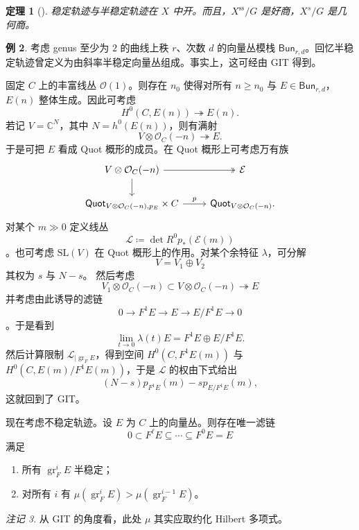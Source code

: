 \documentclass{amsart}
\newtheorem{thm}{定理}[section]
\theoremstyle{definition}
\newtheorem{exm}[thm]{例}
\theoremstyle{remark}
\newtheorem{rmk}[thm]{注记}
\theoremstyle{plain}
\theoremstyle{definition}
\theoremstyle{remark}
\newcommand{\C}{\mathbb{C}}
\newcommand{\mc}[1]{\mathcal{#1}}
\newcommand{\mr}[1]{\mathrm{#1}}
\newcommand{\on}[1]{\operatorname{#1}}
\newcommand{\ms}[1]{\mathsf{#1}}
\newcommand{\1}{\mathbf{1}}
\newcommand{\2}{\mathbf{2}}
\newcommand{\3}{\mathbf{3}}
\begin{document}
\begin{thm}[{\cite{MFK1994}}]
    稳定轨迹与半稳定轨迹在 \(X\) 中开。而且，\(X^{\on{ss}}/G\) 是好商，\(X^s/G\) 是几何商。
\end{thm}

\begin{exm}
    考虑 genus 至少为 \(2\) 的曲线上秩 \(r\)、次数 \(d\) 的向量丛模栈 \(\ms{Bun}_{r,d}\)。回忆半稳定轨迹曾定义为由斜率半稳定向量丛组成。事实上，这可经由 GIT 得到。

    固定 \(C\) 上的丰富线丛 \(\mc{O}(1)\)。则存在 \(n_0\) 使得对所有 \(n \geq n_0\) 与 \(E \in \ms{Bun}_{r,d}\)，\(E(n)\) 整体生成。因此可考虑
    \[ H^0(C, E(n)) \twoheadrightarrow E(n). \]
    若记 \(V = \C^N\)，其中 \(N = h^0(E(n))\)，则有满射
    \[ V \otimes \mc{O}_C(-n) \twoheadrightarrow E. \]
    于是可把 \(E\) 看成 Quot 概形的成员。在 Quot 概形上可考虑万有族
    \begin{equation*}
    \begin{tikzcd}
        V \otimes \mc{O}_C(-n) \ar[twoheadrightarrow]{r} \ar{d} & \mc{E} \\
        \ms{Quot}_{V \otimes \mc{O}_C(-n), p_E} \times C \ar{r}{p} & \ms{Quot}_{V \otimes \mc{O}_C(-n)}.
    \end{tikzcd}
    \end{equation*}
    对某个 \(m \gg 0\) 定义线丛
    \[ \mc{L} \coloneqq \det R^0 p_* (\mc{E}(m)) \]
    。也可考虑 \(\mr{SL}(V)\) 在 Quot 概形上的作用。对某个余特征 \(\lambda\)，可分解
    \[ V = V_1 \oplus V_2 \]
    其权为 \(s\) 与 \(N-s\)。
    然后考虑
    \[ V_1 \otimes \mc{O}_C(-n) \subset V \otimes \mc{O}_C(-n) \twoheadrightarrow E \]
    并考虑由此诱导的滤链
    \[ 0 \to F^1 E \to E \to E / F^1 E \to 0 \]
    。于是看到
    \[ \lim_{t \to 0} \lambda(t) E = F^1 E \oplus E/F^1 E. \]
    然后计算限制 \(\mc{L}_{|\on{gr}_F E}\)，得到空间 \(H^0(C, F^1 E(m))\) 与 \(H^0(C, E(m)/F^1 E(m))\)，于是 \(\mc{L}\) 的权由下式给出
    \[ (N-s) p_{F^1 E}(m) - s p_{E/F^1 E}(m), \]
    这就回到了 GIT。
\end{exm}

现在考虑不稳定轨迹。设 \(E\) 为 \(C\) 上的向量丛。则存在唯一滤链
\[ 0 \subset F^{\ell} E \subseteq \cdots \subseteq F^0 E = E \]
满足
\begin{enumerate}
    \item 所有 \(\on{gr}_F^i E\) 半稳定；
    \item 对所有 \(i\) 有 \(\mu(\on{gr}_F^i E) > \mu(\on{gr}_F^{i-1} E)\)。
\end{enumerate}
\begin{rmk}
    从 GIT 的角度看，此处 \(\mu\) 其实应取约化 Hilbert 多项式。
\end{rmk}
\end{document}
